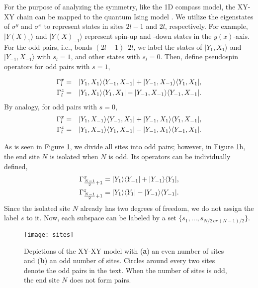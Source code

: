 \documentclass[twocolumn,floats,superscriptaddress]{revtex4}
\begin{document}
 {For the purpose of analyzing the symmetry, like the 1D compass model, the XY-XY chain can be mapped to the quantum Ising model \cite{Lieb1961,Katsura1962,Brzezicki2009}. We utilize the eigenstates of $\sigma^y$ and $\sigma^x$ to represent states in sites $2l-1$ and $2l$, respectively. For example, $|Y(X)_1\rangle$ and $|Y(X)_{-1}\rangle$ represent spin-up and -down states in the $y(x)$-axis. For the odd pairs, i.e., {bonds $(2l-1)$--$2l$}, %
 we label the states of $|Y_1, X_1\rangle$ and $|Y_{-1}, X_{-1}\rangle$ with $s_l=1$, and other states with $s_l=0$. Then, define pseudospin operators for odd pairs with $s=1$,

\begin{eqnarray}
\Gamma_l^x&=&|Y_1,X_{1}\rangle\langle Y_{-1},X_{-1}|+| Y_{-1},X_{-1}\rangle\langle Y_1,X_{1}|,\notag
\\
\Gamma_l^z&=&|Y_1,X_{1}\rangle\langle Y_{1},X_{1}|-| Y_{-1},X_{-1}\rangle\langle Y_{-1},X_{-1}|.\label{newspin1}
\end{eqnarray}
By analogy, for odd pairs with $s=0$,
\begin{eqnarray}
\Gamma_l^x&=&|Y_1,X_{-1}\rangle\langle Y_{-1},X_{1}|+| Y_{-1},X_{1}\rangle\langle Y_1,X_{-1}|,\notag
\\
\Gamma_l^z&=&|Y_1,X_{-1}\rangle\langle Y_{1},X_{-1}|-| Y_{-1},X_{1}\rangle\langle Y_{-1},X_{1}|.\label{newspin2}
\end{eqnarray}
}
As is seen in Figure \ref{sites}, we divide all sites into odd pairs; however, in Figure \ref{sites}b, the end site $N$ is isolated when $N$ is odd. Its operators can be individually defined,
\begin{gather}
\Gamma_{\frac{N-1}{2}+1}^x=|Y_1\rangle\langle Y_{-1}|+| Y_{-1}\rangle\langle Y_1|,\notag
\\
\Gamma_{\frac{N-1}{2}+1}^z=|Y_1\rangle\langle Y_{1}|-| Y_{-1}\rangle\langle Y_{-1}|.\label{newspin2}
\end{gather}
Since the isolated site $N$ already has two degrees of freedom, we do not assign the label $s$ to it. Now, each subspace can be labeled by a set $\{s_1,...,s_{N/2\, or\, (N-1)/2}\}$.


\begin{figure}[ H]
\centering
\texttt{[image: sites]}
\caption{ {Depictions of the XY-XY model with ({\bf a}) an even number of sites and ({\bf b}) an odd number of sites. Circles around every two sites denote the odd pairs in the text. When the number of sites is odd, the end site $N$ does not form pairs.}}
\label{sites}
\end{figure}
\end{document}
